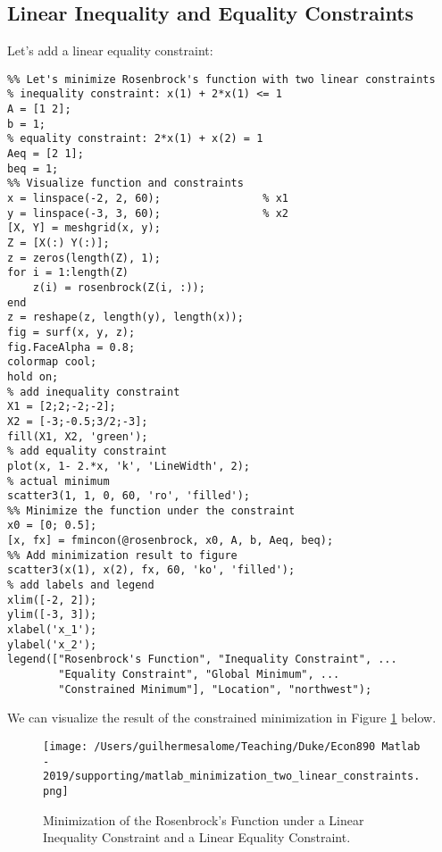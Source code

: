 \documentclass[12pt, a4paper]{article}
\begin{document}
\subsection{Linear Inequality and Equality Constraints}
\label{sec:orgc88d1df}
Let's add a linear equality constraint:
\lstset{language=matlab,label= ,caption= ,captionpos=b,firstnumber=1,numbers=left,style=Matlab-editor}
\begin{lstlisting}
%% Let's minimize Rosenbrock's function with two linear constraints
% inequality constraint: x(1) + 2*x(1) <= 1
A = [1 2];
b = 1;
% equality constraint: 2*x(1) + x(2) = 1
Aeq = [2 1];
beq = 1;
%% Visualize function and constraints
x = linspace(-2, 2, 60);                % x1
y = linspace(-3, 3, 60);                % x2
[X, Y] = meshgrid(x, y);
Z = [X(:) Y(:)];
z = zeros(length(Z), 1);
for i = 1:length(Z)
    z(i) = rosenbrock(Z(i, :));
end
z = reshape(z, length(y), length(x));
fig = surf(x, y, z);
fig.FaceAlpha = 0.8;
colormap cool;
hold on;
% add inequality constraint
X1 = [2;2;-2;-2];
X2 = [-3;-0.5;3/2;-3];
fill(X1, X2, 'green');
% add equality constraint
plot(x, 1- 2.*x, 'k', 'LineWidth', 2);
% actual minimum
scatter3(1, 1, 0, 60, 'ro', 'filled');
%% Minimize the function under the constraint
x0 = [0; 0.5];
[x, fx] = fmincon(@rosenbrock, x0, A, b, Aeq, beq);
%% Add minimization result to figure
scatter3(x(1), x(2), fx, 60, 'ko', 'filled');
% add labels and legend
xlim([-2, 2]);
ylim([-3, 3]);
xlabel('x_1');
ylabel('x_2');
legend(["Rosenbrock's Function", "Inequality Constraint", ...
        "Equality Constraint", "Global Minimum", ...
        "Constrained Minimum"], "Location", "northwest");

\end{lstlisting}

We can visualize the result of the constrained minimization in Figure \ref{fig:org968d02a} below.
\begin{figure}[H]
\centering
\texttt{[image: /Users/guilhermesalome/Teaching/Duke/Econ890 Matlab - 2019/supporting/matlab\_minimization\_two\_linear\_constraints.png]}
\caption{\label{fig:org968d02a}
Minimization of the Rosenbrock's Function under a Linear Inequality Constraint and a Linear Equality Constraint.}
\end{figure}
\end{document}
